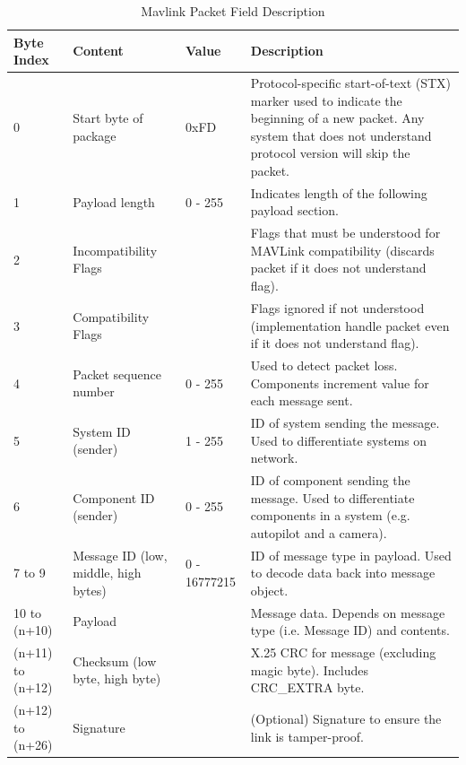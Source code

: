 \begin{table}[ht]
\begin{tabularx}{\textwidth}{|p{1.5cm}|p{3cm}|p{1.8cm}|X|}
\hline
\textbf{Byte Index} 	&\textbf{Content}					   & \textbf{Value}     & \textbf{Description} \\ \hline 
0 						& Start byte of package                & 0xFD         		& Protocol-specific start-of-text (STX) marker used to indicate the beginning of a new packet. Any system that does not understand protocol version will skip the packet. \\  \hline
1                    	& Payload length                       & 0 - 255      		& Indicates length of the following payload section.                                                                                                                      \\  \hline
2                    	& Incompatibility Flags                &              		& Flags that must be understood for MAVLink compatibility (discards packet if it does not understand flag).                                                \\  \hline
3                    	& Compatibility Flags                  &              		& Flags ignored if not understood (implementation handle packet even if it does not understand flag). \\  \hline
4                    	& Packet sequence number               & 0 - 255      		& Used to detect packet loss. Components increment value for each message sent. \\  \hline
5                    	& System ID (sender)                   & 1 - 255      		& ID of system sending the message. Used to differentiate systems on network. \\  \hline
6                   	& Component ID (sender)                & 0 - 255      		& ID of component sending the message. Used to differentiate components in a system (e.g. autopilot and a camera).   \\  \hline
7 to 9               	& Message ID (low, middle, high bytes) & 0 - 16777215 		& ID of message type in payload. Used to decode data back into message object. \\  \hline
10 to (n+10)         	& Payload                              &              		& Message data. Depends on message type (i.e. Message ID) and contents.  \\  \hline
(n+11) to (n+12)     	& Checksum (low byte, high byte)       &              		& X.25 CRC for message (excluding magic byte). Includes CRC\_EXTRA byte. \\  \hline
(n+12) to (n+26)     	& Signature                            &              		& (Optional) Signature to ensure the link is tamper-proof. \\ \hline                                                                           
\end{tabularx}
\caption{Mavlink Packet Field Description \cite{MavlinkSerialization}}
\label{tbl:mavlink-frame}
\end{table}

